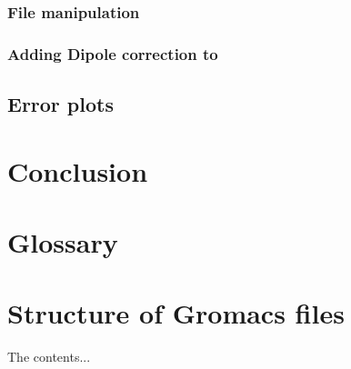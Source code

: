 \documentclass[12pt,twoside,a4paper]{report}
\begin{document}
\subsection{File manipulation}
\subsection{Adding Dipole correction to }



\section{Error plots}

\chapter*{Conclusion}

\nocite{*}

 

\begin{appendices}
\chapter{Glossary}
\chapter{Structure of Gromacs files}
The contents...
\end{appendices}
\end{document}
